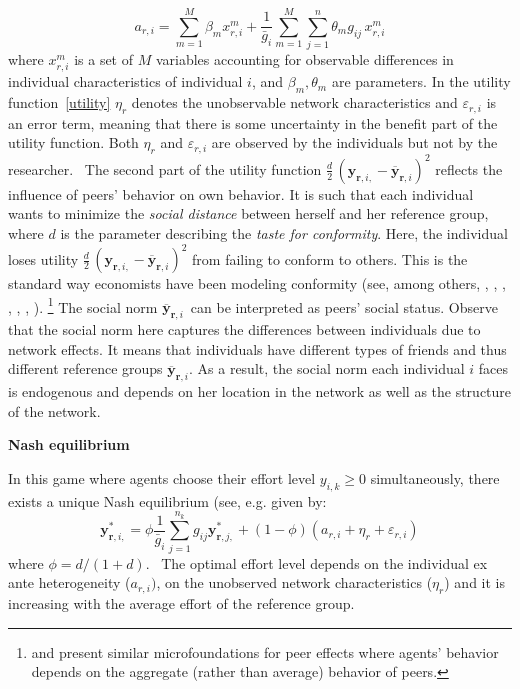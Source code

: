 \documentclass[nojss]{jss}
\begin{document}
\begin{equation}
a_{r, i}=\sum_{m=1}^{M}\beta _{m}x_{r, i}^{m}+\frac{1}{\bar g_{i}}%
\sum_{m=1}^{M}\sum_{j=1}^{n}\theta _{m}g_{ij}\,x_{r, i}^{m}  \label{MUI}
\end{equation}%
where $x_{r, i}^{m}$ is a set of $M$ variables accounting for observable
differences in individual characteristics of individual $i$, and $\beta
_{m},\theta _{m}$ are parameters. In the utility function~\ref{utility} $\eta _{r}$ denotes the unobservable network characteristics and $\varepsilon
_{r, i}$ is an error term, meaning that there is some uncertainty in the
benefit part of the utility function. Both $\eta _{r}$ and $\varepsilon
_{r, i}$ are observed by the individuals but not by the researcher. \ The
second part of the utility function $\frac{d}{2}\,(\mathbf{y}_{\mathbf{r}, i,}-\overline{\mathbf{y}}_{\mathbf{r}, i})^2$ reflects the influence of peers' behavior on own behavior. It is
such that each individual wants to minimize the \emph{social distance}
between herself and her reference group, where $d$ is the parameter
describing the \emph{taste for conformity}. Here, the individual loses
utility $\frac{d}{2}\,(\mathbf{y}_{\mathbf{r}, i,}-\overline{\mathbf{y}}_{\mathbf{r}, i})^2$ from failing to
conform to others. This is the standard way economists have been modeling
conformity (see, among others, \cite{Akerlof1980}, \cite{Bernheim1994}, \cite{Kandel1992}, \cite{Akerlof1997}, \cite{Fershtman1998},  \cite{Patacchini2012}, \cite{PatacchiniRainone2012}).%
\footnote{%
\cite{Ballester+Armengol+Zenou:2006} and \cite{Armengol2009} present similar
microfoundations for peer effects where agents' behavior depends on the
aggregate (rather than average) behavior of peers.}
The social norm $\overline{\mathbf{y}}_{\mathbf{r}, i}$\ can be interpreted as peers' social
status. Observe that the social norm here captures the differences between
individuals due to network effects. It means that individuals have
different types of friends and thus different reference groups $\overline{\mathbf{y}}_{\mathbf{r}, i}$. As a result, the social norm each individual $i$ faces is
endogenous and depends on her location in the network as well as the
structure of the network.

\textbf{Nash equilibrium}

In this game where agents choose their effort level $y_{i,k}\geq 0$
simultaneously, there exists a unique Nash equilibrium (see, e.g. \cite{Patacchini2012} given by:%
\begin{equation}
\mathbf{y}_{\mathbf{r}, i,}^{\ast }=\phi \frac{1}{\bar g_{i}}\sum_{j=1}^{n_{k}}g_{ij}\mathbf{y}_{\mathbf{r}, j,}^{\ast
}+\left( 1-\phi \right) \left( a_{r, i}+\eta _{r}+\varepsilon _{r, i}\right) 
\label{FOC}
\end{equation}%
where $\phi =d/(1+d)$. \ The optimal effort level depends on the individual
ex ante heterogeneity ($a_{r, i})$, on the unobserved network characteristics
($\eta _{r}$) and it is increasing with the average effort of the reference
group. 
\end{document}
